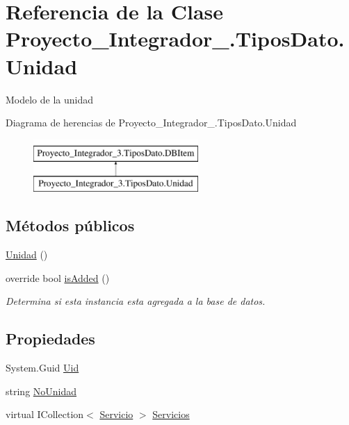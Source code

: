 \hypertarget{class_proyecto___integrador__3_1_1_tipos_dato_1_1_unidad}{\section{Referencia de la Clase Proyecto\-\_\-\-Integrador\-\_.\-Tipos\-Dato.\-Unidad}
\label{class_proyecto___integrador__3_1_1_tipos_dato_1_1_unidad}
}


Modelo de la unidad  


Diagrama de herencias de Proyecto\-\_\-\-Integrador\-\_.\-Tipos\-Dato.\-Unidad\begin{figure}[H]
\begin{center}
\leavevmode
\includegraphics[height=2.000000cm]{d7/dff/class_proyecto___integrador__3_1_1_tipos_dato_1_1_unidad}
\end{center}
\end{figure}
\subsection*{Métodos públicos}
\begin{DoxyCompactItemize}
\item 
\hyperlink{class_proyecto___integrador__3_1_1_tipos_dato_1_1_unidad_adcd7f607349eab8b07b34e7761b78aaa}{Unidad} ()
\item 
override bool \hyperlink{class_proyecto___integrador__3_1_1_tipos_dato_1_1_unidad_a6566d517c25b9048021422510c544611}{is\-Added} ()
\begin{DoxyCompactList}\small\item\em Determina si esta instancia esta agregada a la base de datos. \end{DoxyCompactList}\end{DoxyCompactItemize}
\subsection*{Propiedades}
\begin{DoxyCompactItemize}
\item 
System.\-Guid \hyperlink{class_proyecto___integrador__3_1_1_tipos_dato_1_1_unidad_aa2e602251694986f3d519ee3db5ffa38}{Uid}
\item 
string \hyperlink{class_proyecto___integrador__3_1_1_tipos_dato_1_1_unidad_a75d59e9f06c1422def3f8630d2a33642}{No\-Unidad}
\item 
virtual I\-Collection$<$ \hyperlink{class_proyecto___integrador__3_1_1_tipos_dato_1_1_servicio}{Servicio} $>$ \hyperlink{class_proyecto___integrador__3_1_1_tipos_dato_1_1_unidad_aca85e685e50da0af6be67e3ee69b1bb1}{Servicios}
\end{DoxyCompactItemize}
